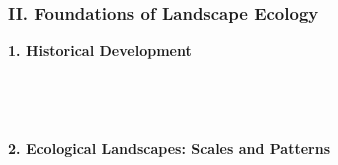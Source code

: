 \documentclass[12pt]{article}
\begin{document}
\subsubsection{II. Foundations of Landscape Ecology}

\textbf{ 1. Historical Development}\\
 \cite{solnetsev_natural_1948}\\
 \cite{troll_geographic_1950}\\
 \cite{watt_pattern_1947}\\
 \cite{wiens_allerton_2008}\\

\textbf{ 2. Ecological Landscapes: Scales and Patterns}\\
 \cite{turner_effects_1989}\\
 \cite{wu_effects_2004}\\
 \cite{legendre_spatial_1989}\\
 \cite{wiens_spatial_1989}\\
\end{document}
